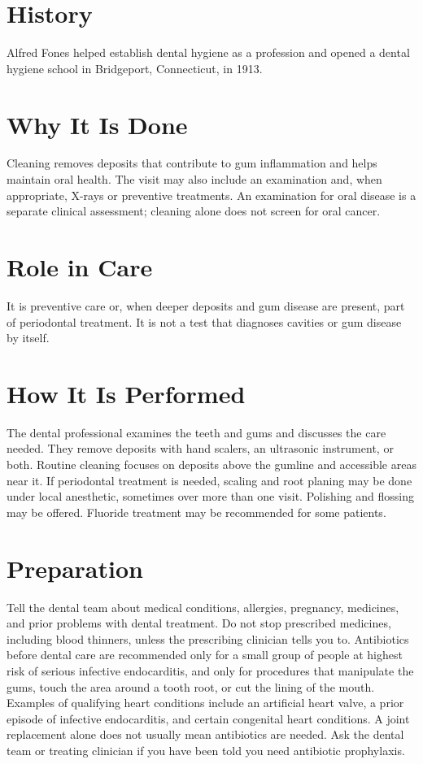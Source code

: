 \section*{History}
Alfred Fones helped establish dental hygiene as a profession and opened a dental hygiene school in Bridgeport, Connecticut, in 1913.

\section*{Why It Is Done}
Cleaning removes deposits that contribute to gum inflammation and helps maintain oral health. The visit may also include an examination and, when appropriate, X-rays or preventive treatments. An examination for oral disease is a separate clinical assessment; cleaning alone does not screen for oral cancer.

\section*{Role in Care}
It is preventive care or, when deeper deposits and gum disease are present, part of periodontal treatment. It is not a test that diagnoses cavities or gum disease by itself.

\section*{How It Is Performed}
The dental professional examines the teeth and gums and discusses the care needed. They remove deposits with hand scalers, an ultrasonic instrument, or both. Routine cleaning focuses on deposits above the gumline and accessible areas near it. If periodontal treatment is needed, scaling and root planing may be done under local anesthetic, sometimes over more than one visit. Polishing and flossing may be offered. Fluoride treatment may be recommended for some patients.

\section*{Preparation}
Tell the dental team about medical conditions, allergies, pregnancy, medicines, and prior problems with dental treatment. Do not stop prescribed medicines, including blood thinners, unless the prescribing clinician tells you to. Antibiotics before dental care are recommended only for a small group of people at highest risk of serious infective endocarditis, and only for procedures that manipulate the gums, touch the area around a tooth root, or cut the lining of the mouth. Examples of qualifying heart conditions include an artificial heart valve, a prior episode of infective endocarditis, and certain congenital heart conditions. A joint replacement alone does not usually mean antibiotics are needed. Ask the dental team or treating clinician if you have been told you need antibiotic prophylaxis.

